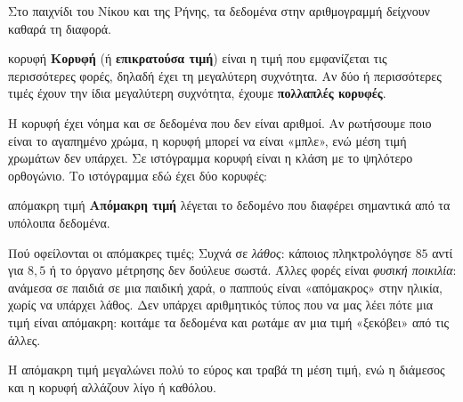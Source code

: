 Στο παιχνίδι του Νίκου και της Ρήνης, τα δεδομένα στην αριθμογραμμή δείχνουν καθαρά τη διαφορά.

\begin{center}
\end{center}

\begin{kanonas}{κορυφή}
\textbf{Κορυφή} (ή \textbf{επικρατούσα τιμή}) είναι η τιμή που εμφανίζεται τις περισσότερες φορές, δηλαδή έχει τη μεγαλύτερη συχνότητα. Αν δύο ή περισσότερες τιμές έχουν την ίδια μεγαλύτερη συχνότητα, έχουμε \textbf{πολλαπλές κορυφές}.
\end{kanonas}

Η κορυφή έχει νόημα και σε δεδομένα που δεν είναι αριθμοί. Αν ρωτήσουμε ποιο είναι το αγαπημένο χρώμα, η κορυφή μπορεί να είναι «μπλε», ενώ μέση τιμή χρωμάτων δεν υπάρχει. Σε ιστόγραμμα κορυφή είναι η κλάση με το ψηλότερο ορθογώνιο. Το ιστόγραμμα εδώ έχει δύο κορυφές:

\begin{center}
\end{center}

\begin{orismos}{απόμακρη τιμή}
\textbf{Απόμακρη τιμή} λέγεται το δεδομένο που διαφέρει σημαντικά από τα υπόλοιπα δεδομένα.
\end{orismos}

Πού οφείλονται οι απόμακρες τιμές; Συχνά σε \emph{λάθος}: κάποιος πληκτρολόγησε $85$ αντί για $8{,}5$ ή το όργανο μέτρησης δεν δούλευε σωστά. Άλλες φορές είναι \emph{φυσική ποικιλία}: ανάμεσα σε παιδιά σε μια παιδική χαρά, ο παππούς είναι «απόμακρος» στην ηλικία, χωρίς να υπάρχει λάθος. Δεν υπάρχει αριθμητικός τύπος που να μας λέει πότε μια τιμή είναι απόμακρη: κοιτάμε τα δεδομένα και ρωτάμε αν μια τιμή «ξεκόβει» από τις άλλες.

Η απόμακρη τιμή μεγαλώνει πολύ το εύρος και τραβά τη μέση τιμή, ενώ η διάμεσος και η κορυφή αλλάζουν λίγο ή καθόλου.

